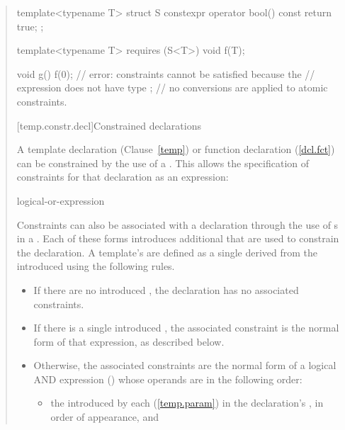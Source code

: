 \begin{quote}
\begin{addedblock}
\begin{codeblock}
template<typename T>
  struct S {
    constexpr operator bool() const { return true; }
  };

template<typename T>
  requires (S<T>{})
    void f(T);

void g() {
  f(0); // error: constraints cannot be satisfied because the
        // expression  does not have type ;
        // no conversions are applied to atomic constraints.
}
\end{codeblock}
\exitexample


[temp.constr.decl]{Constrained declarations}

\pnum
A template declaration (Clause~\ref{temp}) or function declaration 
(\ref{dcl.fct}) can be constrained by the use of a 
. 
% 
This allows the specification of constraints for that declaration as
an expression:

\begin{bnf}
\br
    logical-or-expression
\end{bnf}

\pnum
Constraints can also be associated with a declaration through the use of 
s in a 
.
% 
Each of these forms introduces additional  
that are used to constrain the declaration.
% 
A template's  are defined as a 
single  derived from the
introduced  using the
following rules.

\begin{itemize}
\item If there are no introduced ,
the declaration has no associated constraints.

\item If there is a single introduced ,
the associated constraint is the normal form of that expression,
as described below.

\item Otherwise, the associated constraints are
the normal form of
a logical AND expression ()
whose operands are in the following order:
% 
\begin{itemize}
\item the  introduced by each
       (\ref{temp.param}) in the 
      declaration's , in
      order of appearance, and


\end{itemize}
\end{itemize}
\end{addedblock}
\end{quote}
